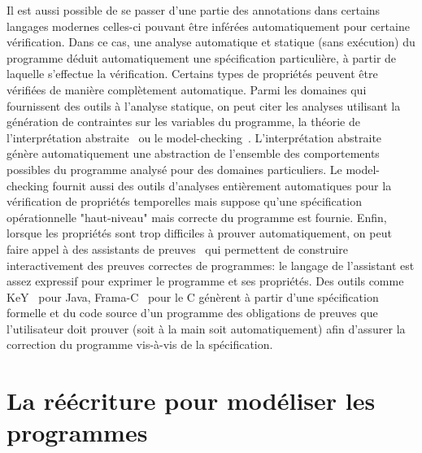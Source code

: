 Il est aussi possible de se passer d'une partie des  annotations dans certains langages modernes
celles-ci pouvant être inférées automatiquement pour certaine vérification.
Dans ce cas, une analyse automatique et statique (sans exécution) du programme
déduit automatiquement une spécification particulière, à partir de laquelle s'effectue la 
vérification. Certains types de propriétés peuvent être vérifiées de manière
complètement automatique.  Parmi les domaines qui fournissent des outils à l'analyse statique,
on peut citer les analyses utilisant la génération de contraintes sur les variables du programme, 
la théorie de l'interprétation abstraite~\cite{CousotC-POPL77} ou le model-checking~\cite{MC-Book}.
L'interprétation abstraite génère automatiquement une abstraction de l'ensemble des comportements possibles
du programme analysé pour des domaines particuliers. Le model-checking fournit aussi des outils d'analyses 
entièrement automatiques pour la vérification de propriétés temporelles mais suppose qu'une spécification opérationnelle
"haut-niveau" mais correcte du programme est fournie. 
Enfin, lorsque les propriétés sont trop difficiles à prouver automatiquement, on peut
faire appel à des assistants de preuves~\cite{Coq, Isa, Agda} qui permettent de construire interactivement 
des preuves correctes de programmes: le langage de l'assistant est assez expressif pour
exprimer le programme et ses propriétés. Des outils comme KeY~\cite{KEY} pour Java, Frama-C~\cite{FRAMAC} pour le C
génèrent à partir d'une spécification formelle et du code source d'un programme
des obligations de preuves que l'utilisateur doit prouver (soit à la main soit automatiquement)
afin d'assurer la correction du programme vis-à-vis de la spécification.

\section{La réécriture pour modéliser les programmes}

